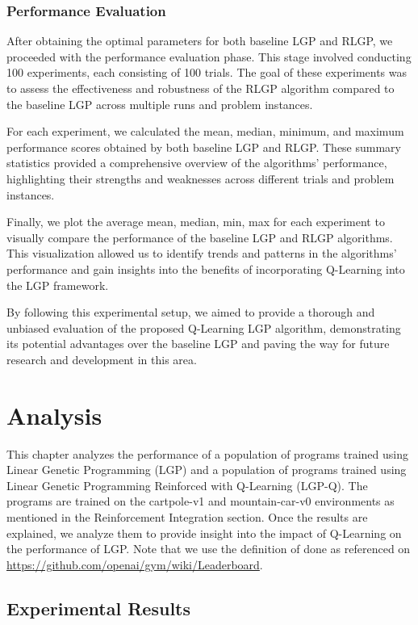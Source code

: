 \documentclass[12pt, final]{dalcsthesis}
\begin{document}
\subsection{Performance Evaluation}

After obtaining the optimal parameters for both baseline LGP and RLGP, we proceeded with the performance evaluation phase. This stage involved conducting 100 experiments, each consisting of 100 trials. The goal of these experiments was to assess the effectiveness and robustness of the RLGP algorithm compared to the baseline LGP across multiple runs and problem instances.

For each experiment, we calculated the mean, median, minimum, and maximum performance scores obtained by both baseline LGP and RLGP. These summary statistics provided a comprehensive overview of the algorithms' performance, highlighting their strengths and weaknesses across different trials and problem instances.

Finally, we plot the average mean, median, min, max for each experiment to visually compare the performance of the baseline LGP and RLGP algorithms. This visualization allowed us to identify trends and patterns in the algorithms' performance and gain insights into the benefits of incorporating Q-Learning into the LGP framework.

By following this experimental setup, we aimed to provide a thorough and unbiased evaluation of the proposed Q-Learning LGP algorithm, demonstrating its potential advantages over the baseline LGP and paving the way for future research and development in this area.

\chapter{Analysis}

This chapter analyzes the performance of a population of programs trained using Linear Genetic Programming (LGP)
and a population of programs trained using Linear Genetic Programming Reinforced with Q-Learning (LGP-Q). The programs
are trained on the cartpole-v1 and mountain-car-v0 environments \cite{1606.01540} as mentioned in the Reinforcement Integration section.
Once the results are explained, we analyze them to provide insight into the impact of Q-Learning on the performance of LGP. Note that we use the definition of done as referenced on \url{https://github.com/openai/gym/wiki/Leaderboard}.

\section{Experimental Results}
\end{document}
